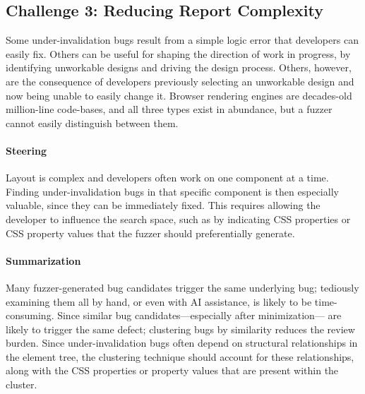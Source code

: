 \subsection{Challenge 3: Reducing Report Complexity}

Some under-invalidation bugs result from
  a simple logic error that developers can easily fix.
Others can be useful for shaping the direction of work in progress,
  by identifying unworkable designs and driving the design process.
Others, however, are the consequence of developers previously
  selecting an unworkable design and now being unable to easily change it.
Browser rendering engines are decades-old million-line code-bases,
  and all three types exist in abundance,
  but a fuzzer cannot easily distinguish between them.

\paragraph{Steering}
Layout is complex and developers often work
  on one component at a time.
Finding under-invalidation bugs in that specific component
  is then especially valuable, since they can be immediately fixed.
This requires allowing the developer to influence the search space,
  such as by indicating CSS properties or CSS property values
  that the fuzzer should preferentially generate.

\paragraph{Summarization}
Many fuzzer-generated bug candidates trigger the same underlying bug;
  tediously examining them all by hand, or even with AI assistance,
  is likely to be time-consuming.
Since similar bug candidates---especially after minimization---%
  are likely to trigger the same defect;
  clustering bugs by similarity reduces the review burden.
Since under-invalidation bugs often depend
  on structural relationships in the element tree,
  the clustering technique should account for these relationships,
  along with the CSS properties or property values
  that are present within the cluster.

